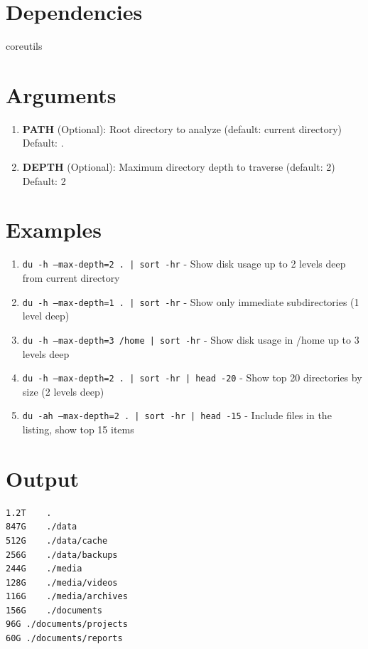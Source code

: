 \documentclass[openany]{book}
\begin{document}
\section*{Dependencies}
coreutils


\section*{Arguments}
\begin{enumerate}
  \item \textbf{PATH} (Optional): Root directory to analyze (default: current directory) \\ Default: .
  \item \textbf{DEPTH} (Optional): Maximum directory depth to traverse (default: 2) \\ Default: 2
\end{enumerate}

\section*{Examples}
\begin{enumerate}
  \item \texttt{du -h --max-depth=2 . | sort -hr} - Show disk usage up to 2 levels deep from current directory
  \item \texttt{du -h --max-depth=1 . | sort -hr} - Show only immediate subdirectories (1 level deep)
  \item \texttt{du -h --max-depth=3 /home | sort -hr} - Show disk usage in /home up to 3 levels deep
  \item \texttt{du -h --max-depth=2 . | sort -hr | head -20} - Show top 20 directories by size (2 levels deep)
  \item \texttt{du -ah --max-depth=2 . | sort -hr | head -15} - Include files in the listing, show top 15 items
\end{enumerate}

\section*{Output}
\begin{lstlisting}
1.2T	.
847G	./data
512G	./data/cache
256G	./data/backups
244G	./media
128G	./media/videos
116G	./media/archives
156G	./documents
96G	./documents/projects
60G	./documents/reports
\end{lstlisting}
\end{document}
